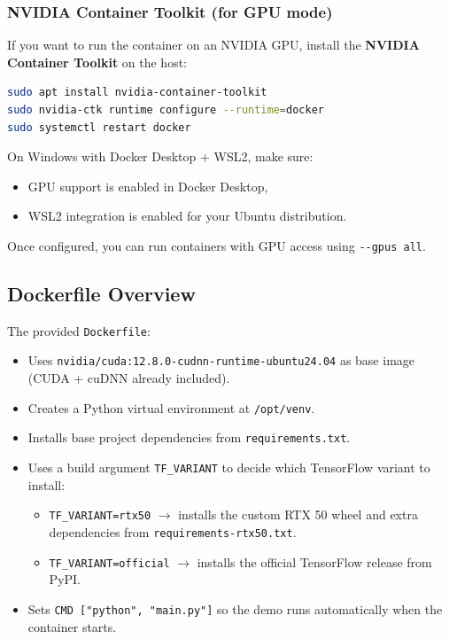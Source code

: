 \documentclass[a4paper,11pt]{article}
\begin{document}
\subsubsection*{NVIDIA Container Toolkit (for GPU mode)}

If you want to run the container on an NVIDIA GPU, install the
\textbf{NVIDIA Container Toolkit} on the host:

\begin{lstlisting}[language=bash]
sudo apt install nvidia-container-toolkit
sudo nvidia-ctk runtime configure --runtime=docker
sudo systemctl restart docker
\end{lstlisting}

On Windows with Docker Desktop + WSL2, make sure:
\begin{itemize}
  \item GPU support is enabled in Docker Desktop,
  \item WSL2 integration is enabled for your Ubuntu distribution.
\end{itemize}

Once configured, you can run containers with GPU access using
\verb|--gpus all|.

\subsection*{Dockerfile Overview}

The provided \texttt{Dockerfile}:
\begin{itemize}
  \item Uses \verb|nvidia/cuda:12.8.0-cudnn-runtime-ubuntu24.04| as base image
        (CUDA + cuDNN already included).
  \item Creates a Python virtual environment at \verb|/opt/venv|.
  \item Installs base project dependencies from \texttt{requirements.txt}.
  \item Uses a build argument \texttt{TF\_VARIANT} to decide which TensorFlow
        variant to install:
        \begin{itemize}
          \item \verb|TF_VARIANT=rtx50| $\rightarrow$ installs the custom RTX 50
                wheel and extra dependencies from \texttt{requirements-rtx50.txt}.
          \item \verb|TF_VARIANT=official| $\rightarrow$ installs the official
                TensorFlow release from PyPI.
        \end{itemize}
  \item Sets \verb|CMD ["python", "main.py"]| so the demo runs automatically
        when the container starts.
\end{itemize}
\end{document}
